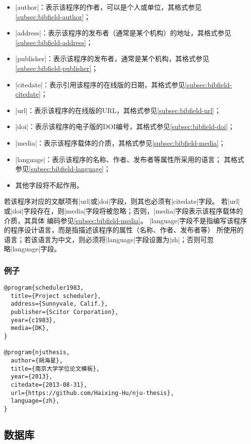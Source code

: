 \begin{itemize}
\item |author|：表示该程序的作者，可以是个人或单位，其格式参见\ref{subsec:bibfield-author}；
\item |address|：表示该程序的发布者（通常是某个机构）的地址，其格式参见
  \ref{subsec:bibfield-address}；
\item |publisher|：表示该程序的发布者，通常是某个机构，其格式参见
  \ref{subsec:bibfield-publisher}；
\item |citedate|：表示引用该程序的在线版的日期，其格式参见\ref{subsec:bibfield-citedate}；
\item |url|：表示该程序的在线版的URL，其格式参见\ref{subsec:bibfield-url}；
\item |doi|：表示该程序的电子版的DOI编号，其格式参见\ref{subsec:bibfield-doi}；
\item |media|：表示该程序载体的介质，其格式参见\ref{subsec:bibfield-media}；
\item |language|：表示该程序的名称、作者、发布者等属性所采用的语言；
其格式参见\ref{subsec:bibfield-language}；
\item 其他字段将不起作用。
\end{itemize}

\begin{note}
若该程序对应的文献项有|url|或|doi|字段，则其也必须有|citedate|字段。
若|url|或|doi|字段存在，则|media|字段将被忽略；否则，|media|字段表示该程序载体的介质，其具体
编码参见\ref{subsec:bibfield-media}。
|language|字段不是指编写该程序的程序设计语言，而是指描述该程序的属性（名称、作者、发布者等）
所使用的语言；若该语言为中文，则必须将|language|字段设置为|zh|；否则可忽略|language|字段。
\end{note}

\subsubsection{例子}

\begin{verbatim}
@program{scheduler1983,
  title={Project scheduler},
  address={Sunnyvale, Calif.},
  publisher={Scitor Corporation},
  year={c1983},
  media={DK},
}

@program{njuthesis,
  author={胡海星},
  title={南京大学学位论文模板},
  year={2013},
  citedate={2013-08-31},
  url={https://github.com/Haixing-Hu/nju-thesis},
  language={zh},
}
\end{verbatim}


\subsection{数据库}\label{subsec:bibtype-database}

